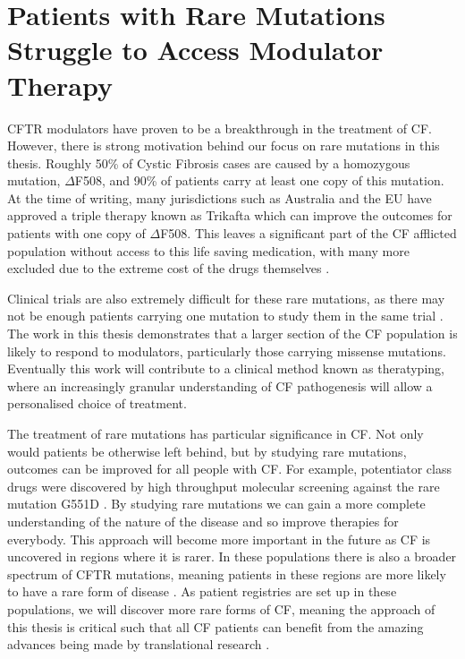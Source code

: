 \section{Patients with Rare Mutations Struggle to Access Modulator Therapy}
CFTR modulators have proven to be a breakthrough in the treatment of CF. However, there is strong motivation behind our focus on rare mutations in this thesis. Roughly 50\% of Cystic Fibrosis cases are caused by a homozygous mutation, $\Delta$F508, and 90\% of patients carry at least one copy of this mutation. At the time of writing, many jurisdictions such as Australia and the EU have approved a triple therapy known as Trikafta which can improve the outcomes for patients with one copy of $\Delta$F508. This leaves a significant part of the CF afflicted population without access to this life saving medication, with many more excluded due to the extreme cost of the drugs themselves \cite{administration2021, trikafta_website, abdallah2021, guo2022a}. 

Clinical trials are also extremely difficult for these rare mutations, as there may not be enough patients carrying one mutation to study them in the same trial \cite{grody2007}. The work in this thesis demonstrates that a larger section of the CF population is likely to respond to modulators, particularly those carrying missense mutations. Eventually this work will contribute to a clinical method known as theratyping, where an increasingly granular understanding of CF pathogenesis will allow a personalised choice of treatment.

The treatment of rare mutations has particular significance in CF. Not only would patients be otherwise left behind, but by studying rare mutations, outcomes can be improved for all people with CF. For example, potentiator class drugs were discovered by high throughput molecular screening against the rare mutation G551D \cite{vangoor2009}. By studying rare mutations we can gain a more complete understanding of the nature of the disease and so improve therapies for everybody. This approach will become more important in the future as CF is uncovered in regions where it is rarer.  In these populations there is also a broader spectrum of CFTR mutations, meaning patients in these regions are more likely to have a rare form of disease \cite{singh2015,zheng2017,ni2022}. As patient registries are set up in these populations, we will discover more rare forms of CF, meaning the approach of this thesis is critical such that all CF patients can benefit from the amazing advances being made by translational research \cite{zheng2017}. 

